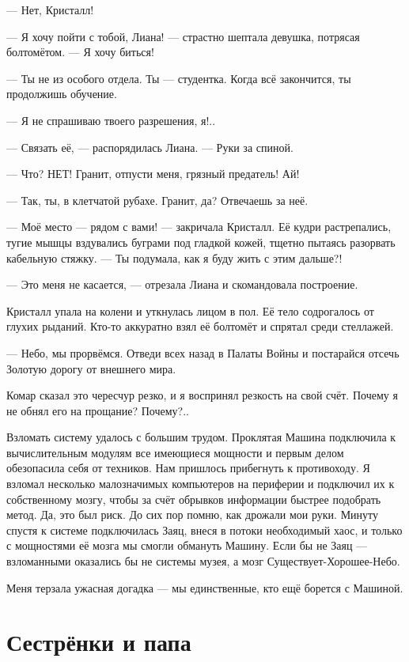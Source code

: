 --- Нет, Кристалл!

--- Я хочу пойти с тобой, Лиана! --- страстно шептала девушка, потрясая болтомётом.
--- Я хочу биться!

--- Ты не из особого отдела.
Ты --- студентка.
Когда всё закончится, ты продолжишь обучение.

--- Я не спрашиваю твоего разрешения, я!..

--- Связать её, --- распорядилась Лиана.
--- Руки за спиной.

--- Что?
НЕТ!
Гранит, отпусти меня, грязный предатель!
Ай!

--- Так, ты, в клетчатой рубахе.
Гранит, да?
Отвечаешь за неё.

--- Моё место --- рядом с вами! --- закричала Кристалл.
Её кудри растрепались, тугие мышцы вздувались буграми под гладкой кожей, тщетно пытаясь разорвать кабельную стяжку.
--- Ты подумала, как я буду жить с этим дальше?!

--- Это меня не касается, --- отрезала Лиана и скомандовала построение.

Кристалл упала на колени и уткнулась лицом в пол.
Её тело содрогалось от глухих рыданий.
Кто-то аккуратно взял её болтомёт и спрятал среди стеллажей.

--- Небо, мы прорвёмся.
Отведи всех назад в Палаты Войны и постарайся отсечь Золотую дорогу от внешнего мира.

Комар сказал это чересчур резко, и я воспринял резкость на свой счёт.
Почему я не обнял его на прощание?
Почему?..

Взломать систему удалось с большим трудом.
Проклятая Машина подключила к вычислительным модулям все имеющиеся мощности и первым делом обезопасила себя от техников.
Нам пришлось прибегнуть к противоходу.
Я взломал несколько малозначимых компьютеров на периферии и подключил их к собственному мозгу, чтобы за счёт обрывков информации быстрее подобрать метод.
Да, это был риск.
До сих пор помню, как дрожали мои руки.
Минуту спустя к системе подключилась Заяц, внеся в потоки необходимый хаос, и только с мощностями её мозга мы смогли обмануть Машину.
Если бы не Заяц --- взломанными оказались бы не системы музея, а мозг Существует-Хорошее-Небо.

Меня терзала ужасная догадка --- мы единственные, кто ещё борется с Машиной.

\section{Сестрёнки и папа}

